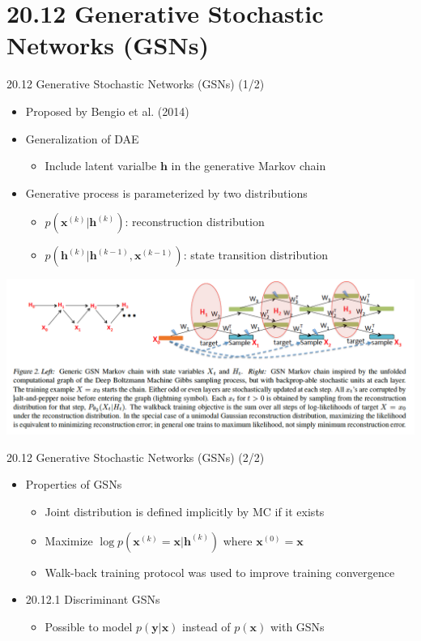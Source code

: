 \documentclass[dvipdfmx,presentation]{beamer}
\def\bf{\mathbf}
\begin{document}
\section{20.12 Generative Stochastic Networks (GSNs)}
\label{sec:orgheadline50}
\begin{frame}[label={sec:orgheadline48}]{20.12 Generative Stochastic Networks (GSNs) (1/2)}
\begin{itemize}
\item Proposed by Bengio et al. (2014)
\item Generalization of DAE
\begin{itemize}
\item Include latent varialbe \(\bf{h}\) in the generative Markov chain
\end{itemize}
\item Generative process is parameterized by two distributions
\begin{itemize}
\item \(p(\bf{x}^{(k)} | \bf{h}^{(k)})\): reconstruction distribution
\item \(p(\bf{h}^{(k)} | \bf{h}^{(k-1)}, \bf{x}^{(k-1)})\): state transition distribution
\end{itemize}
\end{itemize}

\centering
\includegraphics[width=\textwidth]{./figure/bengio2014gsnfig2.png}
\end{frame}


\begin{frame}[label={sec:orgheadline49}]{20.12 Generative Stochastic Networks (GSNs) (2/2)}
\begin{itemize}
\item Properties of GSNs
\begin{itemize}
\item Joint distribution is defined implicitly by MC if it exists
\item Maximize \(\log p(\bf{x}^{(k)} = \bf{x} | \bf{h}^{(k)})\) where \(\bf{x}^{(0)} = \bf{x}\)
\item Walk-back training protocol was used to improve training convergence
\end{itemize}
\item 20.12.1 Discriminant GSNs
\begin{itemize}
\item Possible to model \(p(\bf{y} | \bf{x})\) instead of \(p(\bf{x})\) with GSNs
\end{itemize}
\end{itemize}
\end{frame}
\end{document}
